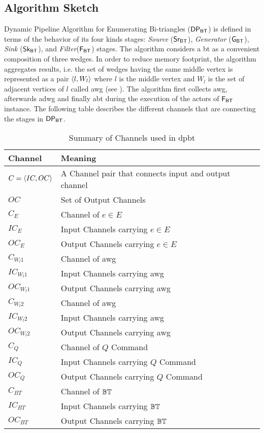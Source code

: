 \subsection{Algorithm Sketch}\label{sub:sec:algo-sketch}
Dynamic Pipeline Algorithm for Enumerating Bi-triangles ($\mathsf{DP_{BT}}$) is defined in terms of the behavior of its four kinds stages: \textit{Source} ($\mathsf{Sr_{BT}}$),  
\textit{Generator} ($\mathsf{G_{BT}}$),  \textit{Sink} ($\mathsf{Sk_{BT}}$), and \textit{Filter}($\mathsf{F_{BT}}$) stages. 
The algorithm considers a \acrlong{bt} as a convenient composition of three wedges.
In order to reduce memory footprint, the algorithm aggregates results, i.e. the set of wedges having the same middle vertex is represented as a pair $\left\langle l, W_l \right\rangle$ where $l$ is the middle vertex and $W_l$ is the set of adjacent vertices of $l$ called \acrfull{awg} (see ).
The algorithm first collects \acrshort{awg}, afterwards \acrshort{adwg} and finally \acrshort{abt} during the execution of the actors of $\mathsf{F_{BT}}$ instance. 
The following table describes the different channels that are connecting the stages in $\mathsf{DP_{BT}}$.

\begin{table}[ht!]
\centering
\begin{tabular}{|p{0.2\linewidth}|p{0.8\linewidth}|} \hline
\textbf{Channel} & \textbf{Meaning}\\ \hline
$C = \left\langle IC, OC \right\rangle$ & A Channel pair that connects input and output channel\\ \hline
$OC$ & Set of Output Channels \\ \hline
$C_E$ & Channel of $e \in E$ \\ \hline
$IC_E$ & Input Channels carrying $e \in E$ \\ \hline
$OC_E$ & Output Channels carrying $e \in E$ \\ \hline
$C_{W_l1}$ & Channel of \acrshort{awg} \\ \hline
$IC_{W_l1}$ & Input Channels carrying \acrshort{awg} \\ \hline
$OC_{W_l1}$ & Output Channels carrying \acrshort{awg} \\ \hline
$C_{W_l2}$ & Channel of \acrshort{awg} \\ \hline
$IC_{W_l2}$ & Input Channels carrying \acrshort{awg} \\ \hline
$OC_{W_l2}$ & Output Channels carrying \acrshort{awg} \\ \hline
$C_Q$ & Channel of $Q$ Command \\ \hline
$IC_Q$ & Input Channels carrying $Q$ Command \\ \hline
$OC_Q$ & Output Channels carrying $Q$ Command \\ \hline
$C_{BT}$ & Channel of $\mathbb{BT}$ \\ \hline
$IC_{BT}$ & Input Channels carrying $\mathbb{BT}$ \\ \hline
$OC_{BT}$ & Output Channels carrying $\mathbb{BT}$ \\ \hline
\end{tabular}
\caption{Summary of Channels used in \acrshort{dpbt}}
\label{table:channels}
\end{table}

